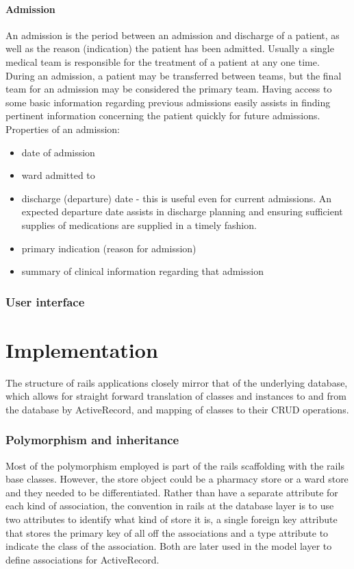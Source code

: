 \documentclass[letterpaper]{amsart}
\begin{document}
\subsection{Admission} An admission is the period between an admission and discharge of a patient, as well as the reason (indication) the patient has been admitted.  Usually a single medical team is responsible for the treatment of a patient at any one time.  During an admission, a patient may be transferred between teams, but the final team for an admission may be considered the primary team.  Having access to some basic information regarding previous admissions easily assists in finding pertinent information concerning the patient quickly for future admissions.   
Properties of an admission:\\
\begin{itemize}
    \item date of admission 
    \item ward admitted to 
    \item discharge (departure) date - this is useful even for current admissions.  An expected departure date assists in discharge planning and ensuring sufficient supplies of medications are supplied in a timely fashion. 
    \item primary indication (reason for admission) 
    \item summary of clinical information regarding that admission 
\end{itemize}

\section{User interface}
\part{Implementation}
The structure of rails applications closely mirror that of the underlying database, which allows for straight forward translation of classes and instances to and from the database by ActiveRecord, and mapping of classes to their CRUD operations.

\section{Polymorphism and inheritance}
Most of the polymorphism employed is part of the rails scaffolding with the rails base classes.  However, the store object could be a pharmacy store or a ward store and they needed to be differentiated.  Rather than have a separate attribute for each kind of association, the convention in rails at the database layer is to use two attributes to identify what kind of store it is, a single foreign key attribute that stores the primary key of all off the associations and a type attribute to indicate the class of the association.  Both are later used in the model layer to define associations for ActiveRecord.
\end{document}
